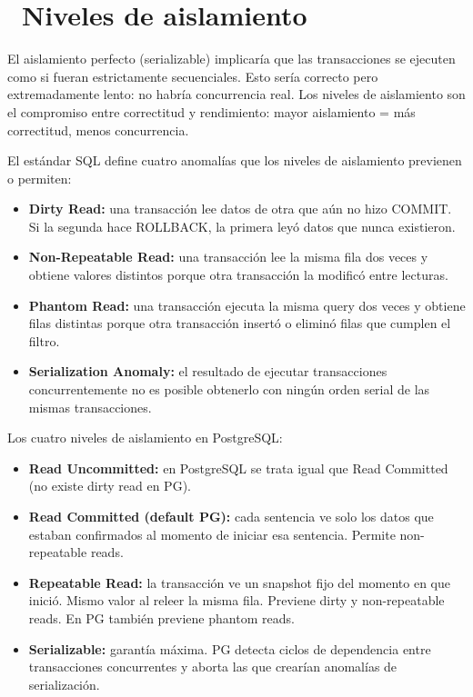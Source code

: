 \section[Niveles de aislamiento]{~Niveles de aislamiento}

El aislamiento perfecto (serializable) implicaría que las transacciones se ejecuten como si fueran estrictamente secuenciales.
Esto sería correcto pero extremadamente lento: no habría concurrencia real.
Los niveles de aislamiento son el compromiso entre correctitud y rendimiento: mayor aislamiento = más correctitud, menos concurrencia.

El estándar SQL define cuatro anomalías que los niveles de aislamiento previenen o permiten:
\begin{itemize}
  \item \textbf{Dirty Read:} una transacción lee datos de otra que aún no hizo COMMIT. Si la segunda hace ROLLBACK, la primera leyó datos que nunca existieron.
  \item \textbf{Non-Repeatable Read:} una transacción lee la misma fila dos veces y obtiene valores distintos porque otra transacción la modificó entre lecturas.
  \item \textbf{Phantom Read:} una transacción ejecuta la misma query dos veces y obtiene filas distintas porque otra transacción insertó o eliminó filas que cumplen el filtro.
  \item \textbf{Serialization Anomaly:} el resultado de ejecutar transacciones concurrentemente no es posible obtenerlo con ningún orden serial de las mismas transacciones.
\end{itemize}

Los cuatro niveles de aislamiento en PostgreSQL:
\begin{itemize}
  \item \textbf{Read Uncommitted:} en PostgreSQL se trata igual que Read Committed (no existe dirty read en PG).
  \item \textbf{Read Committed (default PG):} cada sentencia ve solo los datos que estaban confirmados al momento de iniciar esa sentencia. Permite non-repeatable reads.
  \item \textbf{Repeatable Read:} la transacción ve un snapshot fijo del momento en que inició. Mismo valor al releer la misma fila. Previene dirty y non-repeatable reads. En PG también previene phantom reads.
  \item \textbf{Serializable:} garantía máxima. PG detecta ciclos de dependencia entre transacciones concurrentes y aborta las que crearían anomalías de serialización.
\end{itemize}

